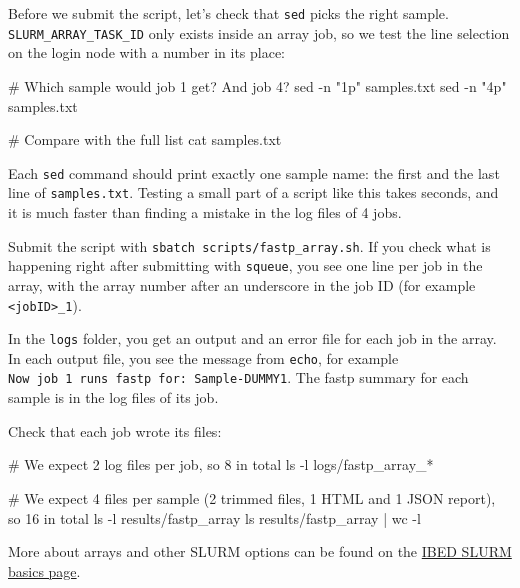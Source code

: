 \documentclass[
  letterpaper,
  DIV=11,
  numbers=noendperiod]{scrreprt}
\newenvironment{Shaded}{}{}
\newcommand{\AttributeTok}[1]{\textcolor[rgb]{0.84,0.23,0.29}{#1}}
\newcommand{\CommentTok}[1]{\textcolor[rgb]{0.42,0.45,0.49}{#1}}
\newcommand{\FunctionTok}[1]{\textcolor[rgb]{0.44,0.26,0.76}{#1}}
\newcommand{\KeywordTok}[1]{\textcolor[rgb]{0.84,0.23,0.29}{#1}}
\newcommand{\NormalTok}[1]{\textcolor[rgb]{0.14,0.16,0.18}{#1}}
\newcommand{\PreprocessorTok}[1]{\textcolor[rgb]{0.84,0.23,0.29}{#1}}
\newcommand{\StringTok}[1]{\textcolor[rgb]{0.01,0.18,0.38}{#1}}
\begin{document}
\begin{tcolorbox}
Before we submit the script, let's check that \texttt{sed} picks the
right sample. \texttt{SLURM\_ARRAY\_TASK\_ID} only exists inside an
array job, so we test the line selection on the login node with a number
in its place:

\begin{Shaded}
\begin{Highlighting}[]
\CommentTok{\# Which sample would job 1 get? And job 4?}
\FunctionTok{sed} \AttributeTok{{-}n} \StringTok{"1p"}\NormalTok{ samples.txt}
\FunctionTok{sed} \AttributeTok{{-}n} \StringTok{"4p"}\NormalTok{ samples.txt}

\CommentTok{\# Compare with the full list}
\FunctionTok{cat}\NormalTok{ samples.txt}
\end{Highlighting}
\end{Shaded}

Each \texttt{sed} command should print exactly one sample name: the
first and the last line of \texttt{samples.txt}. Testing a small part of
a script like this takes seconds, and it is much faster than finding a
mistake in the log files of 4 jobs.

Submit the script with \texttt{sbatch\ scripts/fastp\_array.sh}. If you
check what is happening right after submitting with \texttt{squeue}, you
see one line per job in the array, with the array number after an
underscore in the job ID (for example
\texttt{\textless{}jobID\textgreater{}\_1}).

In the \texttt{logs} folder, you get an output and an error file for
each job in the array. In each output file, you see the message from
\texttt{echo}, for example
\texttt{Now\ job\ 1\ runs\ fastp\ for:\ Sample-DUMMY1}. The fastp
summary for each sample is in the log files of its job.

Check that each job wrote its files:

\begin{Shaded}
\begin{Highlighting}[]
\CommentTok{\# We expect 2 log files per job, so 8 in total}
\FunctionTok{ls} \AttributeTok{{-}l}\NormalTok{ logs/fastp\_array\_}\PreprocessorTok{*}

\CommentTok{\# We expect 4 files per sample (2 trimmed files, 1 HTML and 1 JSON report), so 16 in total}
\FunctionTok{ls} \AttributeTok{{-}l}\NormalTok{ results/fastp\_array}
\FunctionTok{ls}\NormalTok{ results/fastp\_array }\KeywordTok{|} \FunctionTok{wc} \AttributeTok{{-}l}
\end{Highlighting}
\end{Shaded}

More about arrays and other SLURM options can be found on the
\href{https://scienceparkstudygroup.github.io/ibed-bioinformatics-page/source/cli/slurm_basics.html}{IBED
SLURM basics page}.

\end{tcolorbox}
\end{document}
